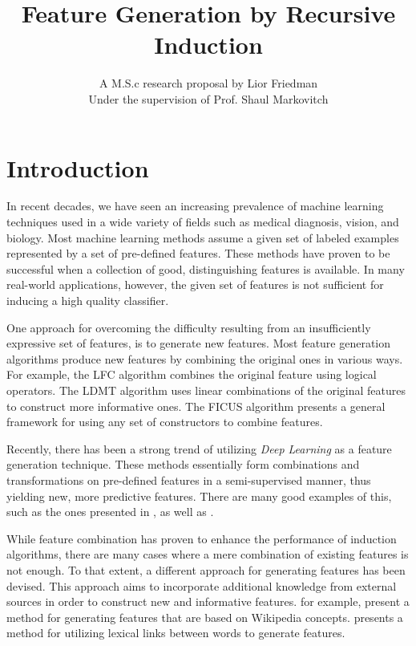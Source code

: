 \documentclass[12pt, a4paper]{article}
\theoremstyle{definition}
\begin{document}
\title{
	{
	Feature Generation by Recursive Induction%
	}\\
}
\author{
    {A M.S.c research proposal by Lior Friedman}\\
    {Under the supervision of Prof. Shaul Markovitch}
}

\maketitle

\section{Introduction}
\label{sec:Intro}
In recent decades, we have seen an increasing prevalence of machine learning techniques used in a wide variety of fields such as medical diagnosis, vision, and biology.
Most machine learning methods assume a given set of labeled examples represented by a set of
pre-defined features. These methods have proven to be successful when a collection of good,
distinguishing features is available.
In many real-world applications, however, the given set of features is not sufficient for inducing a high quality classifier.

One approach for overcoming the difficulty resulting from an insufficiently expressive set of features, is to generate new features.  Most feature generation algorithms produce new features by combining the original ones in various ways.  For example, the LFC algorithm \citep{ragavan1993complex} combines the original feature using logical operators.  The LDMT algorithm \citep{utgo1991linear} uses linear combinations of the original features to construct more informative ones.  The FICUS algorithm \citep{markovitch2002feature} presents a general framework for using any set of constructors to combine features.

Recently, there has been a strong trend of utilizing \emph{Deep Learning} \citep{lecun1998gradient, bengio2009learning} as a feature generation technique. These methods essentially form combinations and transformations on pre-defined features in a semi-supervised manner, thus yielding new, more predictive features.
There are many good examples of this, such as the ones presented in \citet{plotz2011feature}, as well as \citet{kim2013deep}.

While feature combination has proven to enhance the performance of induction algorithms, there are many cases where a mere combination of existing features is not enough.  To that extent, a different approach for generating features has been devised.  This approach aims to incorporate additional knowledge from external sources in order to construct new and informative features.
\citet{gabrilovich2007computing} for example, present a method for generating features that are based on Wikipedia concepts. \citet{jarmasz2012roget} presents a method for utilizing lexical links between words to generate features.
\end{document}
